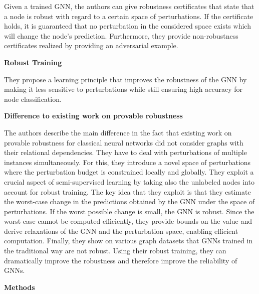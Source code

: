 \documentclass[a4paper,preprint]{sig-alternate}
\begin{document}
Given a trained GNN, the authors can give robustness certificates that state that a
node is robust with regard to a certain space of perturbations. If the certificate
holds, it is guaranteed that no perturbation in the considered space exists
which will change the node's prediction. Furthermore, they provide non-robustness
certificates realized by providing an adversarial example.\newline

\textbf{Robust Training}\newline

They propose a learning principle that improves the robustness of the GNN
by making it less sensitive to perturbations while still ensuring high
accuracy for node classification.\newline

\textbf{Difference to existing work on provable robustness}\newline

The authors describe the main difference in the fact that existing work on provable robustness for classical neural networks
did not consider graphs with their relational dependencies. They have to deal with perturbations of multiple instances simultaneously.
For this, they introduce a novel space of perturbations where the perturbation budget is constrained locally and globally.
They exploit a crucial aspect of semi-supervised learning by taking also the unlabeled nodes into account for robust training.\newline
The key idea that they exploit is that they estimate the worst-case change in the predictions obtained by the GNN under
the space of perturbations. If the worst possible change is small, the GNN is robust. Since the worst-case cannot be computed
efficiently, they provide bounds on the value and derive relaxations of the GNN and the perturbation space, 
enabling efficient computation. Finally, they show on various graph datasets that GNNs trained in the traditional way are not robust. 
Using their robust training,  they can dramatically improve the robustness and therefore improve the reliability of GNNs.

\vfill
\pagebreak

\textbf{Methods}\newline
\end{document}
